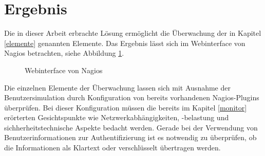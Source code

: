 \section{Ergebnis}

Die in dieser Arbeit erbrachte Lösung ermöglicht die Überwachung der in Kapitel \ref{elemente} genannten Elemente.
Das Ergebnis lässt sich im Webinterface von Nagios betrachten, siehe Abbildung \ref{nweb}.


\begin{figure}[ht]
	\centering
		\caption{Webinterface von Nagios}
		\label{nweb}
\end{figure}

Die einzelnen Elemente der Überwachung lassen sich mit Ausnahme der Benutzersimulation durch Konfiguration von bereits vorhandenen Nagios-Plugins überprüfen.
Bei dieser Konfiguration müssen die bereits im Kapitel \ref{monitor} erörterten Gesichtspunkte wie Netzwerkabhängigkeiten, -belastung und sichherheitstechnische Aspekte bedacht werden.
Gerade bei der Verwendung von Benutzerinformationen zur Authentifizierung ist es notwendig zu überprüfen, ob die Informationen als Klartext oder verschlüsselt übertragen werden.\\

